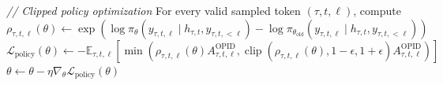 \begin{algorithm}[t]
\begin{algorithmic}[1]
    \State \textcolor{green!50!black}{\textit{// Clipped policy optimization}}
    \State For every valid sampled token $(\tau,t,\ell)$, compute\vspace{-1pt}
    \State $\rho_{\tau,t,\ell}(\theta) \gets
    \exp\!\left(
    \log\pi_{\theta}(y_{\tau,t,\ell}\mid h_{\tau,t},y_{\tau,t,<\ell})
    -\log\pi_{\theta_{\mathrm{old}}}(y_{\tau,t,\ell}\mid h_{\tau,t},y_{\tau,t,<\ell})
    \right)$
    \State $\displaystyle
    \mathcal{L}_{\mathrm{policy}}(\theta) \gets
    -\mathbb{E}_{\tau,t,\ell}\!\left[
    \min\!\left(
    \rho_{\tau,t,\ell}(\theta)A^{\mathrm{OPID}}_{\tau,t,\ell},
    \operatorname{clip}(\rho_{\tau,t,\ell}(\theta),1-\epsilon,1+\epsilon)
    A^{\mathrm{OPID}}_{\tau,t,\ell}
    \right)\right]$
    \State $\theta \gets \theta-\eta\nabla_{\theta}
    \mathcal{L}_{\mathrm{policy}}(\theta)$
\EndFor
\end{algorithmic}
\end{algorithm}
